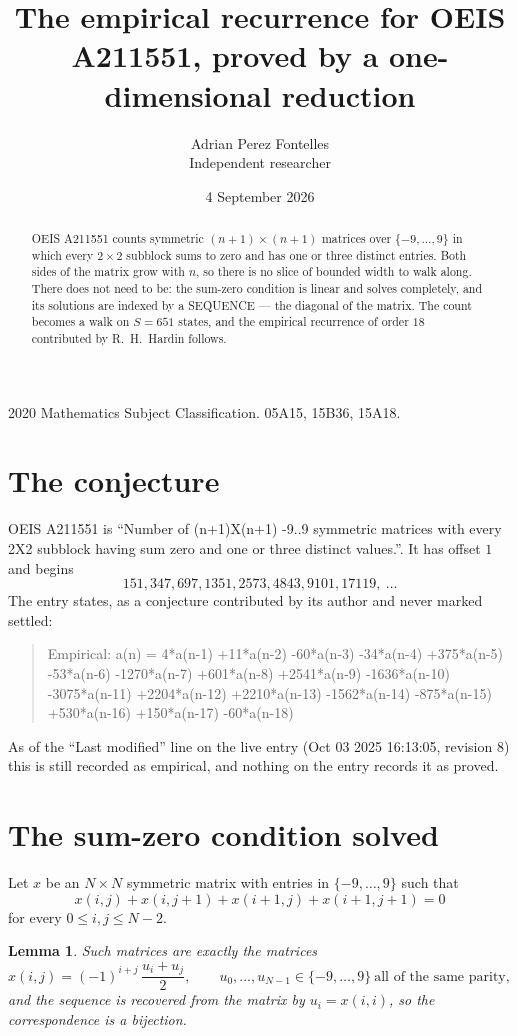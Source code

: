 \documentclass[11pt,a4paper]{article}
\title{The empirical recurrence for OEIS A211551, proved by a one-dimensional reduction}
\author{Adrian Perez Fontelles\\ \small Independent researcher}
\date{4 September 2026}
\theoremstyle{plain}
\newtheorem{lemma}[theorem]{Lemma}
\theoremstyle{definition}
\begin{document}
\maketitle

\begin{abstract}
OEIS A211551 counts symmetric $(n+1)\times(n+1)$ matrices over
$\{-9,\dots,9\}$ in which every $2\times2$ subblock sums to zero and has one or three distinct
entries. Both sides of the matrix grow with $n$, so there is no slice of bounded width to walk
along. There does not need to be: the sum-zero condition is linear and solves completely, and
its solutions are indexed by a SEQUENCE --- the diagonal of the matrix. The count becomes a walk
on $S=651$ states, and the empirical recurrence of order $18$ contributed by R.~H.~Hardin
follows.
\end{abstract}

\noindent\small 2020 Mathematics Subject Classification. 05A15, 15B36, 15A18.\normalsize

\section{The conjecture}

OEIS A211551 is ``Number of (n+1)X(n+1) -9..9 symmetric matrices with every 2X2 subblock having sum zero and one or three distinct values.''. It has offset $1$ and begins
\[
151, 347, 697, 1351, 2573, 4843, 9101, 17119,\ \dots
\]
The entry states, as a conjecture contributed by its author and never marked settled:
\begin{quote}
Empirical: a(n) = 4*a(n-1) +11*a(n-2) -60*a(n-3) -34*a(n-4) +375*a(n-5) -53*a(n-6) -1270*a(n-7) +601*a(n-8) +2541*a(n-9) -1636*a(n-10) -3075*a(n-11) +2204*a(n-12) +2210*a(n-13) -1562*a(n-14) -875*a(n-15) +530*a(n-16) +150*a(n-17) -60*a(n-18)
\end{quote}
As of the ``Last modified'' line on the live entry (Oct 03 2025 16:13:05, revision 8) this is still
recorded as empirical, and nothing on the entry records it as proved.

\section{The sum-zero condition solved}

Let $x$ be an $N\times N$ symmetric matrix with entries in $\{-9,\dots,9\}$ such that
\[
x(i,j)+x(i,j{+}1)+x(i{+}1,j)+x(i{+}1,j{+}1)=0
\]
for every $0\le i,j\le N-2$.

\begin{lemma}\label{lem:solve}
Such matrices are exactly the matrices
\[
x(i,j)=(-1)^{i+j}\,\frac{u_i+u_j}{2},
\qquad u_0,\dots,u_{N-1}\in\{-9,\dots,9\}\ \text{all of the same parity},
\]
and the sequence is recovered from the matrix by $u_i=x(i,i)$, so the correspondence is a
bijection.
\end{lemma}
\end{document}
